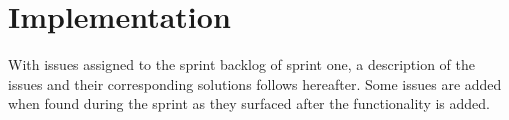 \section{Implementation}
With issues assigned to the sprint backlog of sprint one, a description of the issues and their corresponding solutions follows hereafter.
Some issues are added when found during the sprint as they surfaced after the functionality is added.











